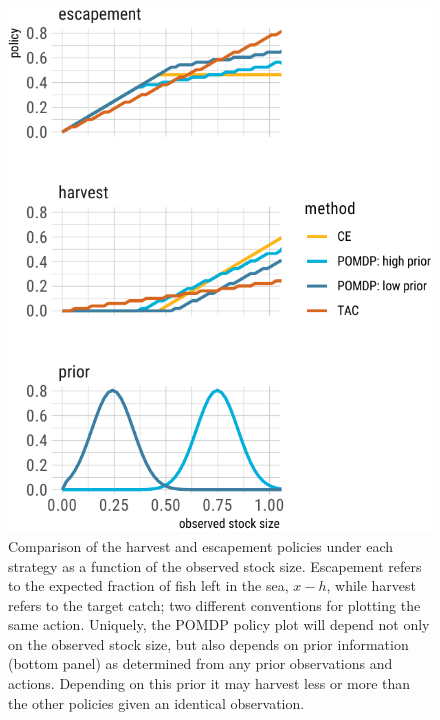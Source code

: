 \documentclass[3p]{elsarticle} %
\makeatletter
\def\maxwidth{\ifdim\Gin@nat@width>\linewidth\linewidth
\else\Gin@nat@width\fi}
\let\Oldincludegraphics\includegraphics
\renewcommand{\includegraphics}[1]{\Oldincludegraphics[width=\maxwidth]{#1}}
\makeatother
\begin{document}
\begin{figure}
\centering
\includegraphics{manuscript_files/figure-latex/policy-1.pdf}
\caption{Comparison of the harvest and escapement policies under each
strategy as a function of the observed stock size. Escapement refers to
the expected fraction of fish left in the sea, \(x-h\), while harvest
refers to the target catch; two different conventions for plotting the
same action. Uniquely, the POMDP policy plot will depend not only on the
observed stock size, but also depends on prior information (bottom
panel) as determined from any prior observations and actions. Depending
on this prior it may harvest less or more than the other policies given
an identical observation.\label{policy}}
\end{figure}
\end{document}
